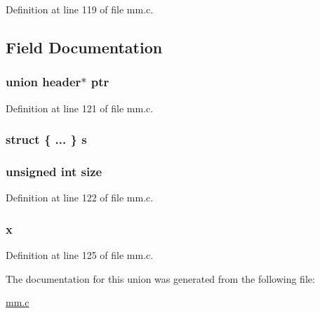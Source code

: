 \-Definition at line 119 of file mm.\-c.



\subsection{\-Field \-Documentation}
\hypertarget{unionheader_a0e84d7fb56aa45d0a3eb7083a5ff1b63}{
\subsubsection[{ptr}]{\setlength{\rightskip}{0pt plus 5cm}union {\bf header}$\ast$ {\bf ptr}}}\label{unionheader_a0e84d7fb56aa45d0a3eb7083a5ff1b63}


\-Definition at line 121 of file mm.\-c.

\hypertarget{unionheader_a958d7cb7719f42c07c1a600553d0db44}{
\subsubsection[{s}]{\setlength{\rightskip}{0pt plus 5cm}struct \{ ... \}   {\bf s}}}\label{unionheader_a958d7cb7719f42c07c1a600553d0db44}
\hypertarget{unionheader_aac913b3a1f6ef005d66bf7a84428773e}{
\subsubsection[{size}]{\setlength{\rightskip}{0pt plus 5cm}unsigned int {\bf size}}}\label{unionheader_aac913b3a1f6ef005d66bf7a84428773e}


\-Definition at line 122 of file mm.\-c.

\hypertarget{unionheader_a5f369a9edd645986a45d0c159773c740}{
\subsubsection[{x}]{ {\bf x}}}\label{unionheader_a5f369a9edd645986a45d0c159773c740}


\-Definition at line 125 of file mm.\-c.



\-The documentation for this union was generated from the following file\-:\begin{DoxyCompactItemize}
\item 
\hyperlink{mm_8c}{mm.\-c}\end{DoxyCompactItemize}
